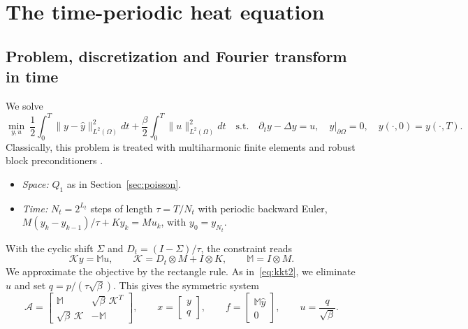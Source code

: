 \documentclass[11pt,a4paper]{article}
\newcommand{\A}{\mathcal{A}}
\theoremstyle{remark}
\begin{document}
\section{The time-periodic heat equation}\label{sec:heat}

\subsection{Problem, discretization and Fourier transform in time}

We solve
\begin{equation}\label{eq:heatocp}
\min_{y,u}\ \frac12\int_0^T\!\!\|y-\hat y\|_{L^2(\Omega)}^2dt+\frac\beta2\int_0^T\!\!\|u\|_{L^2(\Omega)}^2dt
\quad\text{s.t.}\quad \partial_ty-\Delta y=u,\quad y|_{\partial\Omega}=0,\quad y(\cdot,0)=y(\cdot,T).
\end{equation}
Classically, this problem is treated with multiharmonic finite elements and
robust block preconditioners \cite{KK12,KKLWZ13}.
\begin{itemize}
\item \emph{Space:} $Q_1$ as in Section~\ref{sec:poisson}.
\item \emph{Time:} $N_t=2^{L_t}$ steps of length $\tau=T/N_t$ with periodic
  backward Euler, $M(y_k-y_{k-1})/\tau+Ky_k=Mu_k$, with $y_0=y_{N_t}$.
\end{itemize}
With the cyclic shift $\Sigma$ and $D_t=(I-\Sigma)/\tau$, the constraint reads
\[
\mathcal Ky=\mathbb Mu,\qquad \mathcal K=D_t\otimes M+I\otimes K,\qquad \mathbb M=I\otimes M .
\]
We approximate the objective by the rectangle rule. As
in~\eqref{eq:kkt2}, we eliminate $u$ and set $q=p/(\tau\sqrt\beta)$. This
gives the symmetric system
\begin{equation}\label{eq:heatkkt}
\A=\begin{bmatrix}\mathbb M & \sqrt\beta\,\mathcal K^T\\ \sqrt\beta\,\mathcal K & -\mathbb M\end{bmatrix},\qquad
x=\begin{bmatrix}y\\ q\end{bmatrix},\qquad f=\begin{bmatrix}\mathbb M\hat y\\ 0\end{bmatrix},\qquad
u=\frac{q}{\sqrt\beta}.
\end{equation}
\end{document}
